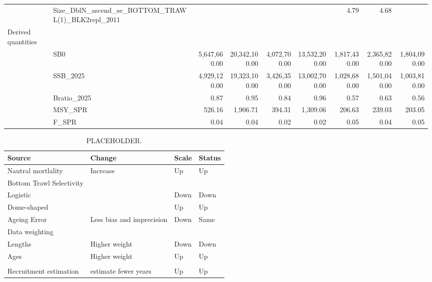 \documentclass[
]{scrartcl}
\begin{document}
\begin{landscape}
\begin{longtable}{llrrrrrrr}
 & Size\_DblN\_ascend\_se\_BOTTOM\_TRAWL(1)\_BLK2repl\_2011 &  &  &  &  & 4.79 & 4.68 &  \\ 
Derived quantities &  &  &  &  &  &  &  &  \\ 
 & SB0 & 5,647,660.00 & 20,342,100.00 & 4,072,700.00 & 13,532,200.00 & 1,817,430.00 & 2,365,820.00 & 1,804,090.00 \\ 
 & SSB\_2025 & 4,929,120.00 & 19,323,100.00 & 3,426,350.00 & 13,002,700.00 & 1,028,680.00 & 1,501,040.00 & 1,003,810.00 \\ 
 & Bratio\_2025 & 0.87 & 0.95 & 0.84 & 0.96 & 0.57 & 0.63 & 0.56 \\ 
 & MSY\_SPR & 526.16 & 1,906.71 & 394.31 & 1,309.06 & 206.63 & 239.03 & 203.05 \\ 
 & F\_SPR & 0.04 & 0.04 & 0.02 & 0.02 & 0.05 & 0.04 & 0.05 \\ 
\bottomrule

\end{longtable}

\endgroup

\end{landscape}

\newpage{}

\begingroup
\fontsize{9.0pt}{10.8pt}\selectfont

\begin{longtable}{llll}

\caption{\label{tbl-uncertainty_summary}PLACEHOLDER.}

\tabularnewline

\toprule
Source & Change & Scale & Status \\ 
\midrule\addlinespace[2.5pt]
Nautral mortlality & Increase & Up & Up \\ 
Bottom Trawl Selectivity &  &  &  \\ 
Logistic &  & Down & Down \\ 
Dome-shaped &  & Up & Up \\ 
Ageing Error & Less bias and imprecision & Down & Same \\ 
Data weighting &  &  &  \\ 
Lengths & Higher weight & Down & Down \\ 
Ages & Higher weight & Up & Up \\ 
 &  &  &  \\ 
Recruitment estimation & estimate fewer years & Up & Up \\ 
\bottomrule

\end{longtable}
\end{document}
